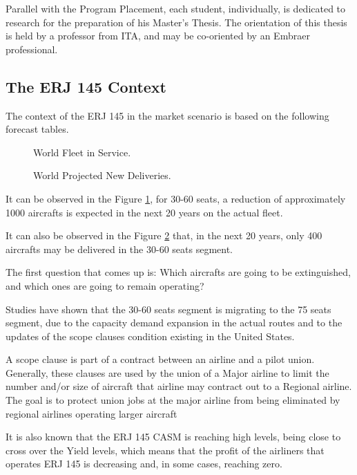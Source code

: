 Parallel with the Program Placement, each student, individually, is dedicated to
research for the preparation of his Master's Thesis. The orientation of this thesis is held
by a professor from ITA, and may be co-oriented by an Embraer professional.

\subsection{The ERJ 145 Context}
The context of the ERJ 145 in the market scenario is based on the following
forecast tables.

\begin{figure}[H] %
\caption{World Fleet in Service.}
\label{fig:WorldFleetInService}
\end{figure}

\begin{figure}[H] %
\caption{World Projected New Deliveries.}
\label{fig:WorldProjectedNewDeliveries}
\end{figure}

It can be observed in the Figure \ref{fig:WorldFleetInService}, for 30-60 seats, a reduction of
approximately 1000 aircrafts is expected in the next 20 years on the actual fleet.

It can also be observed in the Figure \ref{fig:WorldProjectedNewDeliveries} that, in the next 20 years, only 400
aircrafts may be delivered in the 30-60 seats segment.

The first question that comes up is: Which aircrafts are going to be extinguished,
and which ones are going to remain operating?

Studies have shown that the 30-60 seats segment is migrating to the 75 seats
segment, due to the capacity demand expansion in the actual routes and to the
updates of the scope clauses condition existing in the United States.

A scope clause is part of a contract between an airline and a pilot union. Generally, these clauses are used by the union of a Major airline to limit the number and/or size of aircraft that airline may contract out to a Regional airline. The goal is to protect union jobs at the major airline from being eliminated by regional airlines operating larger aircraft

It is also known that the ERJ 145 CASM is reaching high levels, being close to
cross over the Yield levels, which means that the profit of the airliners that operates ERJ 145 is decreasing and, in some cases, reaching zero.

